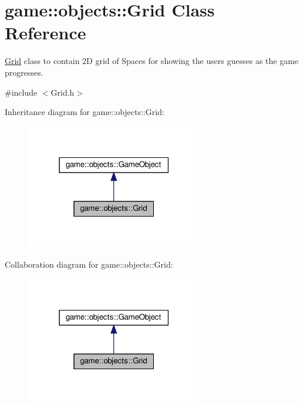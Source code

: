 \hypertarget{classgame_1_1objects_1_1Grid}{}\section{game\+:\+:objects\+:\+:Grid Class Reference}
\label{classgame_1_1objects_1_1Grid}


\hyperlink{classgame_1_1objects_1_1Grid}{Grid} class to contain 2D grid of Spaces for showing the user\textquotesingle{}s guesses as the game progresses.  




{\ttfamily \#include $<$Grid.\+h$>$}



Inheritance diagram for game\+:\+:objects\+:\+:Grid\+:\nopagebreak
\begin{figure}[H]
\begin{center}
\leavevmode
\includegraphics[width=219pt]{classgame_1_1objects_1_1Grid__inherit__graph}
\end{center}
\end{figure}


Collaboration diagram for game\+:\+:objects\+:\+:Grid\+:\nopagebreak
\begin{figure}[H]
\begin{center}
\leavevmode
\includegraphics[width=219pt]{classgame_1_1objects_1_1Grid__coll__graph}
\end{center}
\end{figure}
